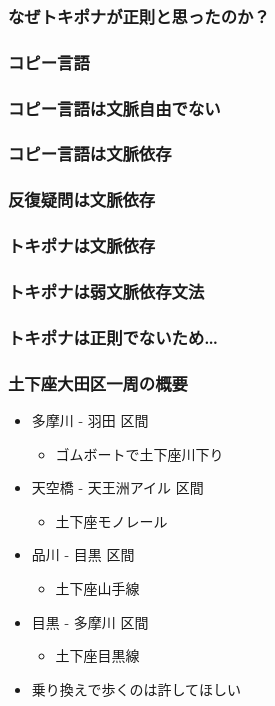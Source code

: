 \documentclass[14pt]{beamer}
\theoremstyle{definition}
\begin{document}
\begin{frame}
	\frametitle{なぜトキポナが正則と思ったのか？}
\end{frame}


\begin{frame}
	\frametitle{コピー言語}
\end{frame}


\begin{frame}
	\frametitle{コピー言語は文脈自由でない}
\end{frame}


\begin{frame}
	\frametitle{コピー言語は文脈依存}
\end{frame}


\begin{frame}
	\frametitle{反復疑問は文脈依存}
\end{frame}


\begin{frame}
	\frametitle{トキポナは文脈依存}
\end{frame}


\begin{frame}
	\frametitle{トキポナは弱文脈依存文法}
\end{frame}


\begin{frame}
	\frametitle{トキポナは正則でないため…}
\end{frame}


\begin{frame}
	\frametitle{土下座大田区一周の概要}

	\begin{itemize}
		\item 多摩川 - 羽田 区間
			\begin{itemize}
				\item ゴムボートで土下座川下り
			\end{itemize}
		\item 天空橋 - 天王洲アイル 区間
			\begin{itemize}
				\item 土下座モノレール
			\end{itemize}
		\item 品川 - 目黒 区間
			\begin{itemize}
				\item 土下座山手線
			\end{itemize}
		\item 目黒 - 多摩川 区間
			\begin{itemize}
				\item 土下座目黒線
			\end{itemize}
		\item 乗り換えで歩くのは許してほしい
	\end{itemize}

\end{frame}
\end{document}
